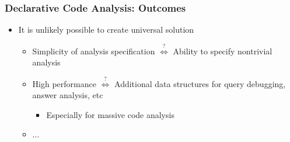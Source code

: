 \documentclass[xcolor=table,aspectratio=169]{beamer}
\begin{document}

\begin{frame}[fragile]
  \frametitle{Declarative Code Analysis: Outcomes}  
  \begin{itemize}
    \item It is unlikely possible to create universal solution
    \begin{itemize}
      \item Simplicity of analysis specification $\overset{\text{?}} \Longleftrightarrow$ Ability to specify nontrivial analysis 
      \item High performance $\overset{\text{?}} \Longleftrightarrow$ Additional data structures for query debugging, answer analysis, etc
      \begin{itemize}
        \item Especially for massive code analysis
      \end{itemize}
      \item ...
    \end{itemize} 
  \end{itemize}
\end{frame}
\end{document}
